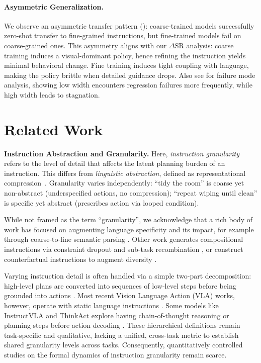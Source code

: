 \documentclass[11pt]{article}
\begin{document}
\paragraph{Asymmetric Generalization.} We observe an asymmetric transfer pattern (): coarse-trained models successfully zero-shot transfer to fine-grained instructions, but fine-trained models fail on coarse-grained ones. This asymmetry aligns with our $\Delta\mathrm{SR}$ analysis: coarse training induces a visual-dominant policy, hence refining the instruction yields minimal behavioral change. Fine training induces tight coupling with language, making the policy brittle when detailed guidance drops. Also see  for failure mode analysis, showing low width encounters regression failures more frequently, while high width leads to stagnation.

\section{Related Work}
\label{sec:related_work}

\textbf{Instruction Abstraction and Granularity.}
Here, \emph{instruction granularity} refers to the level of detail that affects the latent planning burden of an instruction. This differs from \emph{linguistic abstraction}, defined as representational compression~\citep{Wing2010ComputationalTW,DBLP:journals/tacl/LachmyPMT22,DBLP:conf/iclr/ZhengMCCCLZ24}. Granularity varies independently: ``tidy the room'' is coarse yet non-abstract (underspecified actions, no compression); ``repeat wiping until clean'' is specific yet abstract (prescribes action via looped condition).

While not framed as the term ``granularity'', we acknowledge that a rich body of work has focused on augmenting language specificity and its impact, for example through coarse-to-fine semantic parsing \citep{dong-lapata-2018-coarse,DBLP:conf/ijcai/LiLF020}.
Other work generates compositional instructions via constraint dropout and sub-task recombination \citep{huang-etal-2025-musc}, or construct counterfactual instructions to augment diversity \citep{glossop2025castcounterfactuallabelsimprove}.

Varying instruction detail is often handled via a simple two-part decomposition: high-level plans are converted into sequences of low-level steps before being grounded into actions \citep{arumugam2017accurately, DBLP:conf/wuwnet/Yang0H24,DBLP:conf/icml/ShiIEKPVTWWFLDG25}. Most recent Vision Language Action (VLA) works, however, operate with static language instructions \citep{ma2025surveyvisionlanguageactionmodelsembodied,li2025cogvla}. Some models like InstructVLA and ThinkAct explore having chain-of-thought reasoning or planning steps before action decoding \citep{DBLP:conf/corl/HuangXXCLFZTMCS22, yang2025instructvlavisionlanguageactioninstructiontuning,huang2025thinkactvisionlanguageactionreasoningreinforced}. These hierarchical definitions remain task-specific and qualitative, lacking a unified, cross-task metric to establish shared granularity levels across tasks. Consequently, quantitatively controlled studies on the formal dynamics of instruction granularity remain scarce.
\end{document}
